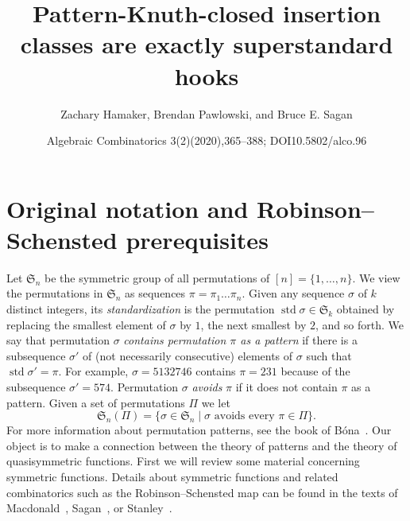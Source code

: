\documentclass[10pt]{amsart}
\title[Pattern-Knuth-closed insertion classes]{Pattern-Knuth-closed insertion classes are exactly superstandard hooks}
\author[Z. Hamaker, B. Pawlowski, and B. E. Sagan]{Zachary Hamaker, Brendan Pawlowski, and Bruce E. Sagan}
\date{Algebraic Combinatorics 3(2)(2020),365–388; DOI10.5802/alco.96}
\DeclareMathOperator{\std}{std}
\newcommand{\si}{\sigma}
\newcommand{\fS}{{\mathfrak S}}
\begin{document}
\maketitle
\section*{Original notation and Robinson--Schensted prerequisites}
Let $\fS_n$ be the symmetric group of all permutations of $[n]=\{1,\dots,n\}$. We view the permutations in $\fS_n$ as sequences $\pi=\pi_1\dots\pi_n$. Given any sequence $\si$ of $k$ distinct integers, its \emph{standardization} is the permutation $\std\si\in\fS_k$ obtained by replacing the smallest element of $\si$ by $1$, the next smallest by $2$, and so forth. We say that permutation $\si$ \emph{contains permutation $\pi$ as a pattern} if there is a subsequence $\si'$ of (not necessarily consecutive) elements of $\si$ such that $\std\si'=\pi$. For example, $\si=5132746$ contains $\pi=231$ because of the subsequence $\si'=574$.
Permutation $\si$ \emph{avoids} $\pi$ if it does not contain $\pi$ as a pattern. Given a set of permutations $\Pi$ we let 
\[
\fS_n(\Pi) =\{\si\in\fS_n \mid \text{$\si$ avoids every $\pi\in\Pi$}\}.
\]
For more information about permutation patterns, see the book of B\'ona~\cite{bon:cp}. Our object is to make a connection between the theory of patterns and the theory of quasisymmetric functions. First we will review some material concerning symmetric functions. Details about symmetric functions and related combinatorics such as the Robinson--Schensted map can be found in the texts of Macdonald~\cite{mac:sfh}, Sagan~\cite{sag:sym}, or Stanley~\cite{sta:ec2}.
\end{document}
